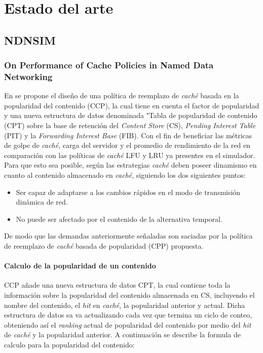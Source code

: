 \documentclass[12pt]{ociamthesis}  %
\begin{document}
\chapter{Estado del arte}
\section{NDNSIM}
\subsection{On Performance of Cache Policies in Named Data Networking \cite{ran2013performance}}

En \cite{ran2013performance} se propone el diseño de una política de reemplazo de \textit{caché} basada en la popularidad del contenido (CCP), la cual tiene en cuenta el factor de popularidad y una nueva estructura de datos denominada "Tabla de popularidad de contenido (CPT) sobre la base de retención del \textit{Content Store} (CS), \textit{Pending Interest Table} (PIT) y la \textit{Forwarding Interest Base} (FIB). Con el fin de beneficiar las métricas de golpe de \textit{caché}, carga del servidor y el promedio de rendimiento de la red en comparación con las políticas de \textit{caché} LFU y LRU ya presentes en el simulador.\\

Para que esto sea posible, según \cite{ran2013performance} las estrategias \textit{caché} deben poseer dinamismo en cuanto al contenido almacenado en \textit{caché}, siguiendo los dos siguientes puntos:

\begin{itemize}
	\item Ser capaz de adaptarse a los cambios rápidos en el modo de transmisión dinámica de red.
	\item No puede ser afectado por el contenido de la alternativa temporal.
\end{itemize}

De modo que las demandas anteriormente señaladas son saciadas por la política de reemplazo de \textit{caché} basada de popularidad (CPP) propuesta.\pagebreak

\subsubsection{Calculo de la popularidad de un contenido}

CCP añade una nueva estructura de datos CPT, la cual contiene toda la información sobre la popularidad del contenido almacenada en CS, incluyendo el nombre del contenido, el \textit{hit} en \textit{caché}, la popularidad anterior y actual. Dicha estructura de datos sa va actualizando cada vez que termina un ciclo de conteo, obteniendo así el \textit{ranking} actual de popularidad del contenido por medio del \textit{hit} de \textit{caché} y la popularidad anterior.
A continuación se describe la formula de calculo para la popularidad del contenido:
\end{document}
